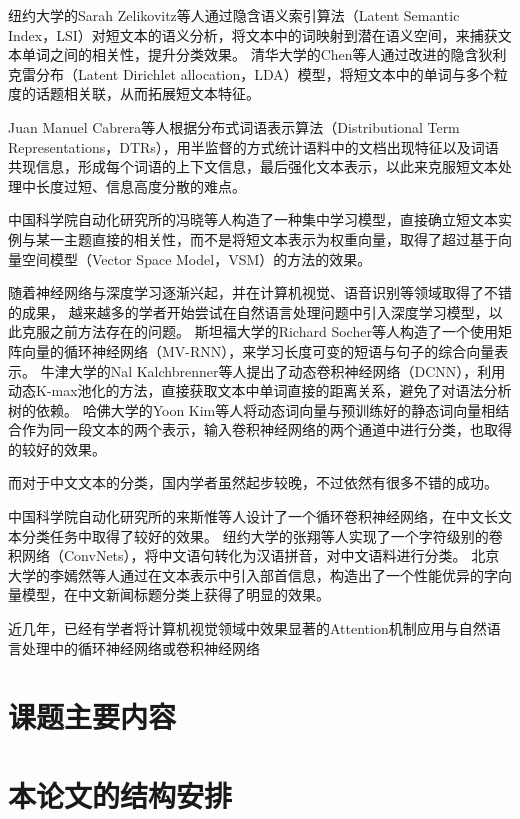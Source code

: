 纽约大学的Sarah Zelikovitz等人通过隐含语义索引算法（Latent Semantic Index，LSI）对短文本的语义分析，将文本中的词映射到潜在语义空间，来捕获文本单词之间的相关性，提升分类效果。
清华大学的Chen等人通过改进的隐含狄利克雷分布（Latent Dirichlet allocation，LDA）模型，将短文本中的单词与多个粒度的话题相关联，从而拓展短文本特征。

Juan Manuel Cabrera等人根据分布式词语表示算法（Distributional Term Representations，DTRs），用半监督的方式统计语料中的文档出现特征以及词语共现信息，形成每个词语的上下文信息，最后强化文本表示，以此来克服短文本处理中长度过短、信息高度分散的难点。

中国科学院自动化研究所的冯晓等人构造了一种集中学习模型，直接确立短文本实例与某一主题直接的相关性，而不是将短文本表示为权重向量，取得了超过基于向量空间模型（Vector Space Model，VSM）的方法的效果。

随着神经网络与深度学习逐渐兴起，并在计算机视觉、语音识别等领域取得了不错的成果，
越来越多的学者开始尝试在自然语言处理问题中引入深度学习模型，以此克服之前方法存在的问题。
斯坦福大学的Richard Socher等人构造了一个使用矩阵向量的循环神经网络（MV-RNN），来学习长度可变的短语与句子的综合向量表示。
牛津大学的Nal Kalchbrenner等人提出了动态卷积神经网络（DCNN），利用动态K-max池化的方法，直接获取文本中单词直接的距离关系，避免了对语法分析树的依赖。
哈佛大学的Yoon Kim等人将动态词向量与预训练好的静态词向量相结合作为同一段文本的两个表示，输入卷积神经网络的两个通道中进行分类，也取得的较好的效果。

而对于中文文本的分类，国内学者虽然起步较晚，不过依然有很多不错的成功。

中国科学院自动化研究所的来斯惟等人设计了一个循环卷积神经网络，在中文长文本分类任务中取得了较好的效果。
纽约大学的张翔等人实现了一个字符级别的卷积网络（ConvNets），将中文语句转化为汉语拼音，对中文语料进行分类。
北京大学的李嫣然等人通过在文本表示中引入部首信息，构造出了一个性能优异的字向量模型，在中文新闻标题分类上获得了明显的效果。

近几年，已经有学者将计算机视觉领域中效果显著的Attention机制应用与自然语言处理中的循环神经网络或卷积神经网络
\section{课题主要内容}
\section{本论文的结构安排}
